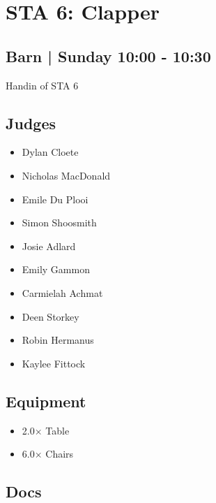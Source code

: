 \documentclass[10pt]{article}
\begin{document}
		\begin{minipage}{\linewidth}
		\setcounter{section}{37}
	\section{STA 6: Clapper }
	\subsection*{Barn | Sunday 10:00 - 10:30}

	Handin of STA 6

	\begin{multicols}{2}
	\subsection*{\faUsers \: Judges}
	\begin{itemize}
			\item Dylan Cloete
			\item Nicholas MacDonald
			\item Emile Du Plooi
			\item Simon Shoosmith
			\item Josie Adlard
			\item Emily Gammon
			\item Carmielah Achmat
			\item Deen Storkey
			\item Robin Hermanus
			\item Kaylee Fittock
		\end{itemize}
	\columnbreak
	\subsection*{\faWrench \: Equipment}
	
        \begin{itemize}
                    \item 2.0$\times$ \: Table
                    \item 6.0$\times$ \: Chairs
                \end{itemize}
                \vfill\null
        \subsection*{\faFile \: Docs}
     	\end{multicols}


	\vspace{1cm}
	\end{minipage}
\end{document}
